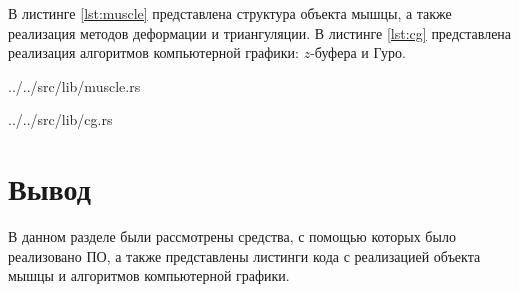 В листинге \ref{lst:muscle} представлена структура объекта мышцы, а также реализация методов деформации и триангуляции. В листинге \ref{lst:cg} представлена реализация алгоритмов компьютерной графики: $z$-буфера и Гуро.

\begin{lstinputlisting}[
        caption={Реализация объекта мышцы.},
        label={lst:muscle},
        style={rust},
        linerange={1-172,311-311}
    ]{../../src/lib/muscle.rs}
\end{lstinputlisting}

\begin{lstinputlisting}[
        caption={Реализация алгоритмов компьютерной графики.},
        label={lst:cg},
        style={rust},
        linerange={1-122}
    ]{../../src/lib/cg.rs}
\end{lstinputlisting}


\section*{Вывод}

В данном разделе были рассмотрены средства, с помощью которых было реализовано ПО, а также представлены листинги кода с реализацией объекта мышцы и алгоритмов компьютерной графики.
